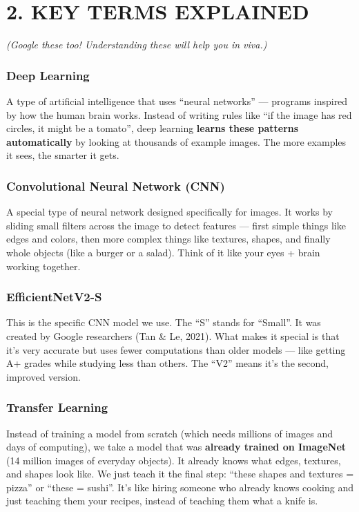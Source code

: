 \documentclass[11pt,a4paper]{article}
\begin{document}
\section{2. KEY TERMS EXPLAINED}
\textit{(Google these too! Understanding these will help you in viva.)}

\subsubsection{Deep Learning}
A type of artificial intelligence that uses ``neural networks'' --- programs inspired by how the human brain works. Instead of writing rules like ``if the image has red circles, it might be a tomato'', deep learning \textbf{learns these patterns automatically} by looking at thousands of example images. The more examples it sees, the smarter it gets.

\subsubsection{Convolutional Neural Network (CNN)}
A special type of neural network designed specifically for images. It works by sliding small filters across the image to detect features --- first simple things like edges and colors, then more complex things like textures, shapes, and finally whole objects (like a burger or a salad). Think of it like your eyes + brain working together.

\subsubsection{EfficientNetV2-S}
This is the specific CNN model we use. The ``S'' stands for ``Small''. It was created by Google researchers (Tan \& Le, 2021). What makes it special is that it's very accurate but uses fewer computations than older models --- like getting A+ grades while studying less than others. The ``V2'' means it's the second, improved version.

\subsubsection{Transfer Learning}
Instead of training a model from scratch (which needs millions of images and days of computing), we take a model that was \textbf{already trained on ImageNet} (14 million images of everyday objects). It already knows what edges, textures, and shapes look like. We just teach it the final step: ``these shapes and textures = pizza'' or ``these = sushi''. It's like hiring someone who already knows cooking and just teaching them your recipes, instead of teaching them what a knife is.
\end{document}

